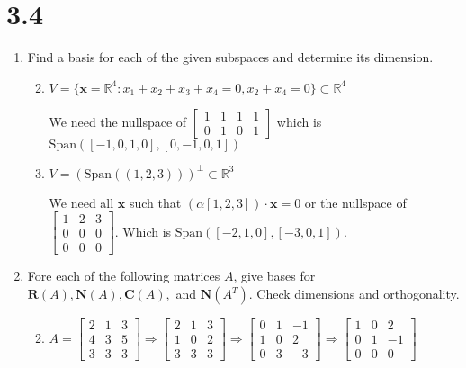 \documentclass[letterpaper]{article}
\newcommand{\Span}{\text{Span}}
\begin{document}
\section*{3.4}
\begin{enumerate}
\item
Find a basis for each of the given subspaces and determine its dimension.
  \begin{enumerate}
  \setcounter{enumii}{1}
  \item
  $V=\{\mathbf{x}=\mathbb{R}^4:x_1+x_2+x_3+x_4=0,x_2+x_4=0\}\subset\mathbb{R}^4$

  We need the nullspace of $\left[\begin{array}{rrrr}1&1&1&1\\0&1&0&1\end{array}\right]$ which is $\Span([-1,0,1,0],[0,-1,0,1])$
  \item
  $V=\left(\text{Span}\left((1,2,3)\right)\right)^\perp\subset\mathbb{R}^3$

  We need all $\mathbf{x}$ such that $(\alpha[1,2,3])\cdot\mathbf{x}=0$ or the nullspace of $\left[\begin{array}{rrr}1&2&3\\0&0&0\\0&0&0\end{array}\right]$. Which is $\Span([-2,1,0],[-3,0,1])$.
  \end{enumerate}
\setcounter{enumi}{2}
\item
Fore each of the following matrices $A$, give bases for $\mathbf{R}(A),\mathbf{N}(A),\mathbf{C}(A),$ and $\mathbf{N}(A^T)$. Check dimensions and orthogonality.
  \begin{enumerate}
  \setcounter{enumii}{1}
  \item
  $A=
  \left[\begin{array}{rrr}
  2&1&3\\
  4&3&5\\
  3&3&3
  \end{array}\right]
  \Rightarrow
  \left[\begin{array}{rrr}
  2&1&3\\
  1&0&2\\
  3&3&3
  \end{array}\right]
  \Rightarrow
  \left[\begin{array}{rrr}
  0&1&-1\\
  1&0&2\\
  0&3&-3
  \end{array}\right]
  \Rightarrow
  \left[\begin{array}{rrr}
  1&0&2\\
  0&1&-1\\
  0&0&0
  \end{array}\right]
  $
  

\end{enumerate}
\end{enumerate}
\end{document}

